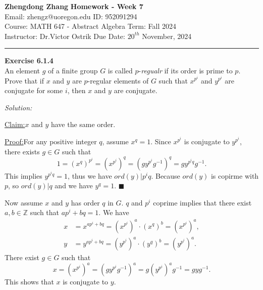 \documentclass[a4paper, 12pt]{article}
\newenvironment{problem}[2][Exercise]
    { \begin{mdframed}[backgroundcolor=gray!20] \textbf{#1 #2} \\}
    {  \end{mdframed}}
\newenvironment{solution}
    {\textit{Solution:}}
    {}
\newenvironment{claim}[1]{\par\noindent\underline{Claim:}\space#1}{}
\newenvironment{claimproof}[1]{\par\noindent\underline{Proof:}\space#1}{\hfill $\blacksquare$}
\begin{document}
\noindent
\large\textbf{Zhengdong Zhang} \hfill \textbf{Homework - Week 7}   \\
Email: zhengz@uoregon.edu \hfill ID: 952091294 \\
\normalsize Course: MATH 647 - Abstract Algebra  \hfill Term: Fall 2024\\
Instructor: Dr.Victor Ostrik \hfill Due Date: $20^{th}$ November, 2024 \\
\noindent\rule{7in}{2.8pt}
\begin{problem}{6.1.4}
An element \(g\) of a finite group \(G\) is called \(p\)-\textit{regualr} if its order is prime to \(p\). Prove that if \(x\) and \(y\) are \(p\)-regular elements of \(G\) such that 
\(x^{p^i}\) and \(y^{p^i}\) are conjugate for some \(i\), then \(x\) and \(y\) are conjugate.
\end{problem}
\begin{solution}
\begin{claim}
\(x\) and \(y\) have the same order.
\end{claim}	
\begin{claimproof}
For any positive integer \(q\), assume \(x^q=1\). Since \(x^{p^i}\) is conjugate to \(y^{p^i}\), there exists \(g\in G\) such that 
\[1=(x^{q})^{p^i}=(x^{p^i})^q=(g y^{p^i}g^{-1})^q=g y^{p^i q}g^{-1}.\]
This implies \(y^{p^i q}=1\), thus we have \(ord(y)|p^i q\). Because \(ord(y)\) is copirme with \(p\), so \(ord(y)|q\) and we have \(y^q=1\).
\end{claimproof}

Now assume \(x\) and \(y\) has order \(q\) in \(G\). \(q\) and \(p^i\) coprime implies that there exist \(a,b\in \mathbb{Z}\) such that \(ap^i+bq=1\). We have 
\begin{align*}
	x & =x^{ap^i+bq}=(x^{p^i})^a\cdot (x^q)^b=(x^{p^i})^a,\\
	y & =y^{ap^i+bq}=(y^{p^i})^a\cdot (y^q)^b=(y^{p^i})^a.
\end{align*}
There exist \(g\in G\) such that 
\[x=(x^{p^i})^a=(g y^{p^i}g^{-1})^a=g (y^{p^i})^a g^{-1}=g y g^{-1}.\]
This shows that \(x\) is conjugate to \(y\).
\end{solution}
\end{document}
